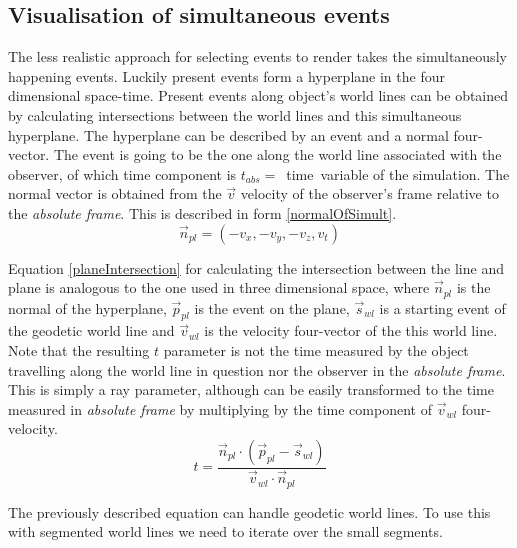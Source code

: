 \documentclass{egpubl}
\begin{document}
\subsection{Visualisation of simultaneous events}
\label{visOfSimEvents}
The less realistic approach for selecting events to render takes the simultaneously happening events. Luckily present events form a hyperplane in the four dimensional space-time. Present events along object's world lines can be obtained by calculating intersections between the world lines and this simultaneous hyperplane. The hyperplane can be described by an event and a normal four-vector. The event is going to be the one along the world line associated with the observer, of which time component is $t_{abs} =$~time~variable of the simulation. The normal vector is obtained from the $\vec{v}$ velocity of the observer's frame relative to the \emph{absolute frame}. This is described in form \ref{normalOfSimult}.
\begin{equation}
\label{normalOfSimult}
\vec{n}_{pl} = (-v_x, -v_y, -v_z, v_t)
\end{equation}

Equation \ref{planeIntersection} for calculating the intersection between the line and plane is analogous to the one used in three dimensional space, where $\vec{n}_{pl}$ is the normal of the hyperplane, $\vec{p}_{pl}$ is the event on the plane, $\vec{s}_{wl}$ is a starting event of the geodetic world line and $\vec{v}_{wl}$ is the velocity four-vector of the this world line. Note that the resulting $t$ parameter is not the time measured by the object travelling along the world line in question nor the observer in the \emph{absolute frame}. This is simply a ray parameter, although can be easily transformed to the time measured in \emph{absolute frame} by multiplying by the time component of $\vec{v}_{wl}$ four-velocity.
\begin{equation}
\label{planeIntersection}
t = \frac{\vec{n}_{pl}\cdot(\vec{p}_{pl} - \vec{s}_{wl})}{\vec{v}_{wl}\cdot\vec{n}_{pl}}
\end{equation}

The previously described equation can handle geodetic world lines. To use this with segmented world lines we need to iterate over the small segments. 
\end{document}
